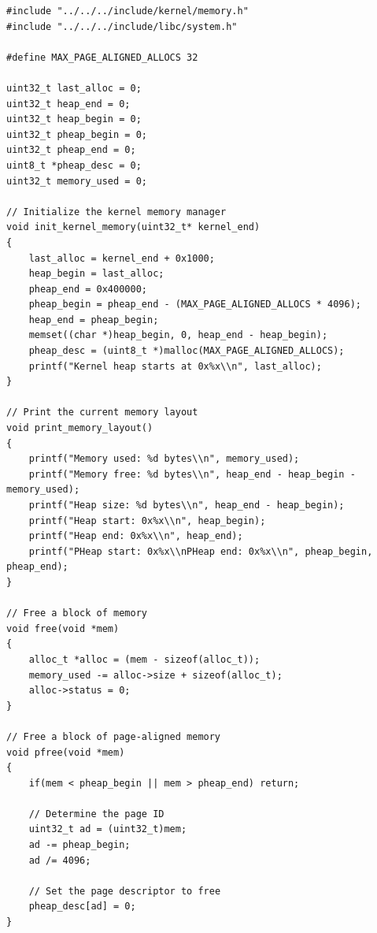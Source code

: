 \documentclass[../main.tex]{subfiles}
\begin{document}
\label{lst:malloc_c}
\begin{verbatim}
#include "../../../include/kernel/memory.h"
#include "../../../include/libc/system.h"

#define MAX_PAGE_ALIGNED_ALLOCS 32

uint32_t last_alloc = 0;
uint32_t heap_end = 0;
uint32_t heap_begin = 0;
uint32_t pheap_begin = 0;
uint32_t pheap_end = 0;
uint8_t *pheap_desc = 0;
uint32_t memory_used = 0;

// Initialize the kernel memory manager
void init_kernel_memory(uint32_t* kernel_end)
{
    last_alloc = kernel_end + 0x1000;
    heap_begin = last_alloc;
    pheap_end = 0x400000;
    pheap_begin = pheap_end - (MAX_PAGE_ALIGNED_ALLOCS * 4096);
    heap_end = pheap_begin;
    memset((char *)heap_begin, 0, heap_end - heap_begin);
    pheap_desc = (uint8_t *)malloc(MAX_PAGE_ALIGNED_ALLOCS);
    printf("Kernel heap starts at 0x%x\\n", last_alloc);
}

// Print the current memory layout
void print_memory_layout()
{
    printf("Memory used: %d bytes\\n", memory_used);
    printf("Memory free: %d bytes\\n", heap_end - heap_begin - memory_used);
    printf("Heap size: %d bytes\\n", heap_end - heap_begin);
    printf("Heap start: 0x%x\\n", heap_begin);
    printf("Heap end: 0x%x\\n", heap_end);
    printf("PHeap start: 0x%x\\nPHeap end: 0x%x\\n", pheap_begin, pheap_end);
}

// Free a block of memory
void free(void *mem)
{
    alloc_t *alloc = (mem - sizeof(alloc_t));
    memory_used -= alloc->size + sizeof(alloc_t);
    alloc->status = 0;
}

// Free a block of page-aligned memory
void pfree(void *mem)
{
    if(mem < pheap_begin || mem > pheap_end) return;

    // Determine the page ID
    uint32_t ad = (uint32_t)mem;
    ad -= pheap_begin;
    ad /= 4096;

    // Set the page descriptor to free
    pheap_desc[ad] = 0;
}


\end{verbatim}
\end{document}
